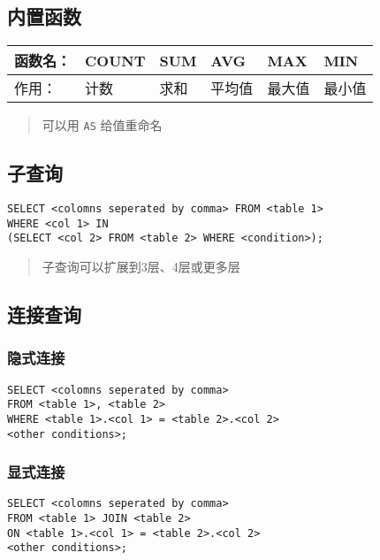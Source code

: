 \documentclass[a4paper, twoside]{article}
\begin{document}
\subsection{内置函数}

\begin{longtable}[c]{@{}llllll@{}}
\toprule
函数名： & COUNT & SUM & AVG & MAX & MIN\tabularnewline
\midrule
\endhead
作用： & 计数 & 求和 & 平均值 & 最大值 & 最小值\tabularnewline
\bottomrule
\end{longtable}

\begin{quote}
可以用 \texttt{AS} 给值重命名
\end{quote}

\subsection{子查询}

\begin{verbatim}
SELECT <colomns seperated by comma> FROM <table 1>
WHERE <col 1> IN
(SELECT <col 2> FROM <table 2> WHERE <condition>);
\end{verbatim}

\begin{quote}
子查询可以扩展到3层、4层或更多层
\end{quote}

\subsection{连接查询}

\subsubsection{隐式连接}

\begin{verbatim}
SELECT <colomns seperated by comma>
FROM <table 1>, <table 2>
WHERE <table 1>.<col 1> = <table 2>.<col 2>
<other conditions>;
\end{verbatim}

\subsubsection{显式连接}

\begin{verbatim}
SELECT <colomns seperated by comma>
FROM <table 1> JOIN <table 2>
ON <table 1>.<col 1> = <table 2>.<col 2>
<other conditions>;
\end{verbatim}
\end{document}
